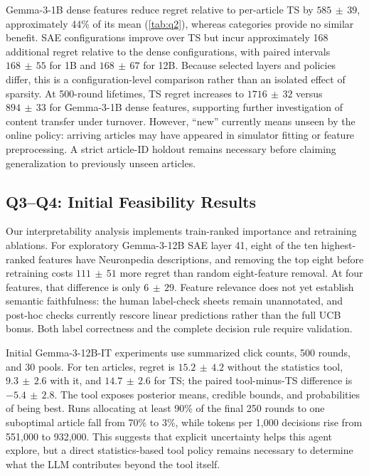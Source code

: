 \documentclass{article}
\newcommand{\ci}[2]{#1\,{\scriptstyle\pm}\,#2}
\begin{document}
Gemma-3-1B dense features reduce regret relative to per-article TS by $\ci{585}{39}$, approximately 44\% of its mean (\cref{tab:q2}), whereas categories provide no similar benefit. SAE configurations improve over TS but incur approximately 168 additional regret relative to the dense configurations, with paired intervals $\ci{168}{55}$ for 1B and $\ci{168}{67}$ for 12B. Because selected layers and policies differ, this is a configuration-level comparison rather than an isolated effect of sparsity. At 500-round lifetimes, TS regret increases to $\ci{1716}{32}$ versus $\ci{894}{33}$ for Gemma-3-1B dense features, supporting further investigation of content transfer under turnover. However, ``new'' currently means unseen by the online policy: arriving articles may have appeared in simulator fitting or feature preprocessing. A strict article-ID holdout remains necessary before claiming generalization to previously unseen articles.

\subsection{Q3--Q4: Initial Feasibility Results}
Our interpretability analysis implements train-ranked importance and retraining ablations. For exploratory Gemma-3-12B SAE layer 41, eight of the ten highest-ranked features have Neuronpedia descriptions, and removing the top eight before retraining costs $\ci{111}{51}$ more regret than random eight-feature removal. At four features, that difference is only $\ci{6}{29}$. Feature relevance does not yet establish semantic faithfulness: the human label-check sheets remain unannotated, and post-hoc checks currently rescore linear predictions rather than the full UCB bonus. Both label correctness and the complete decision rule require validation.

Initial Gemma-3-12B-IT experiments use summarized click counts, 500 rounds, and 30 pools. For ten articles, regret is $\ci{15.2}{4.2}$ without the statistics tool, $\ci{9.3}{2.6}$ with it, and $\ci{14.7}{2.6}$ for TS; the paired tool-minus-TS difference is $\ci{-5.4}{2.8}$. The tool exposes posterior means, credible bounds, and probabilities of being best. Runs allocating at least 90\% of the final 250 rounds to one suboptimal article fall from 70\% to 3\%, while tokens per 1,000 decisions rise from 551,000 to 932,000. This suggests that explicit uncertainty helps this agent explore, but a direct statistics-based tool policy remains necessary to determine what the LLM contributes beyond the tool itself.
\end{document}
